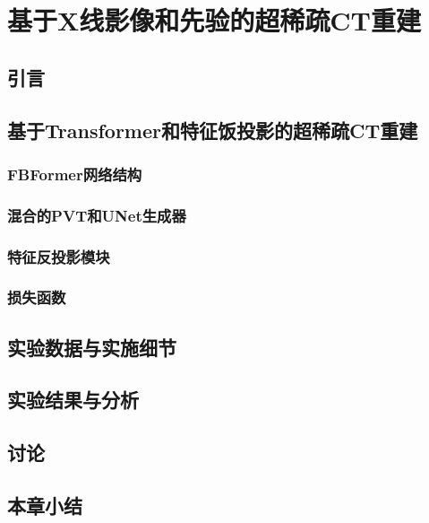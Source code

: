 
\chapter{基于X线影像和先验的超稀疏CT重建}

\section{引言}

\section{基于Transformer和特征饭投影的超稀疏CT重建}
\subsection{FBFormer网络结构}

\subsection{混合的PVT和UNet生成器}

\subsection{特征反投影模块}

\subsection{损失函数}

\section{实验数据与实施细节}

\section{实验结果与分析}

\section{讨论}

\section{本章小结}

